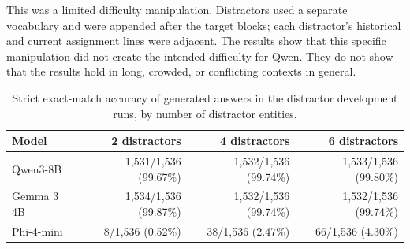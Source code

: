 This was a limited difficulty manipulation. Distractors used a separate vocabulary and were appended after the target blocks; each distractor's historical and current assignment lines were adjacent. The results show that this specific manipulation did not create the intended difficulty for Qwen. They do not show that the results hold in long, crowded, or conflicting contexts in general.

\begin{table}[h]
\caption{Strict exact-match accuracy of generated answers in the distractor development runs, by number of distractor entities.}
\label{tab:e-accuracy}
\begin{center}
\small
\begin{tabular}{@{}lrrr@{}}
\toprule
Model & 2 distractors & 4 distractors & 6 distractors \\
\midrule
Qwen3-8B & 1,531/1,536 (99.67\%) & 1,532/1,536 (99.74\%) & 1,533/1,536 (99.80\%) \\
Gemma 3 4B & 1,534/1,536 (99.87\%) & 1,532/1,536 (99.74\%) & 1,532/1,536 (99.74\%) \\
Phi-4-mini & 8/1,536 (0.52\%) & 38/1,536 (2.47\%) & 66/1,536 (4.30\%) \\
\bottomrule
\end{tabular}
\end{center}
\end{table}

\FloatBarrier
